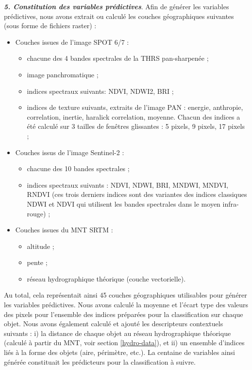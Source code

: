 \documentclass[12pt,twoside]{reedthesis}
\providecommand{\tightlist}{%
  \setlength{\itemsep}{0pt}\setlength{\parskip}{0pt}}
\begin{document}
\textbf{\emph{5. Constitution des variables prédictives}}. Afin de générer les variables prédictives, nous avons extrait ou calculé les couches géographiques suivantes (sous forme de fichiers raster) :
\begin{itemize}
\tightlist
\item
  Couches issues de l'image SPOT 6/7 :
  \begin{itemize}
  \tightlist
  \item
    chacune des 4 bandes spectrales de la THRS pan-sharpenée ;
  \item
    image panchromatique ;
  \item
    indices spectraux suivants: NDVI, NDWI2, BRI ;
  \item
    indices de texture suivants, extraits de l'image PAN : energie, anthropie, correlation, inertie, haralick correlation, moyenne. Chacun des indices a été calculé sur 3 tailles de fenêtres glissantes : 5 pixels, 9 pixels, 17 pixels ;
  \end{itemize}
\item
  Couches issus de l'image Sentinel-2 :
  \begin{itemize}
  \tightlist
  \item
    chacune des 10 bandes spectrales ;
  \item
    indices spectraux suivants : NDVI, NDWI, BRI, MNDWI, MNDVI, RNDVI (ces trois derniers indices sont des variantes des indices classiques NDWI et NDVI qui utilisent les bandes spectrales dans le moyen infra-rouge) ;
  \end{itemize}
\item
  Couches issues du MNT SRTM :
  \begin{itemize}
  \tightlist
  \item
    altitude ;
  \item
    pente ;
  \item
    réseau hydrographique théorique (couche vectorielle).
  \end{itemize}
\end{itemize}
Au total, cela représentait ainsi 45 couches géographiques utilisables pour générer les variables prédictives. Nous avons calculé la moyenne et l'écart type des valeurs des pixels pour l'ensemble des indices préparées pour la classification sur chaque objet. Nous avons également calculé et ajouté les descripteurs contextuels suivants : i) la distance de chaque objet au réseau hydrographique théorique (calculé à partir du MNT, voir section \ref{hydro-data}), et ii) un ensemble d'indices liés à la forme des objets (aire, périmètre, etc.). La centaine de variables ainsi générée constituait les prédicteurs pour la classification à suivre.\\
\end{document}

